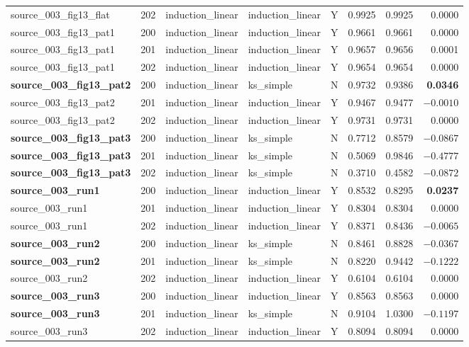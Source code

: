 \documentclass{article}
\begin{document}
\begin{table}[htbp]
\begin{tabular}{@{}p{3.0cm}rrp{2.8cm}p{2.8cm}rrr@{}}
source\_003\_fig13\_flat & 202 & induction\_linear & induction\_linear & Y & 0.9925 & 0.9925 & 0.0000 \\
source\_003\_fig13\_pat1 & 200 & induction\_linear & induction\_linear & Y & 0.9661 & 0.9661 & 0.0000 \\
source\_003\_fig13\_pat1 & 201 & induction\_linear & induction\_linear & Y & 0.9657 & 0.9656 & 0.0001 \\
source\_003\_fig13\_pat1 & 202 & induction\_linear & induction\_linear & Y & 0.9654 & 0.9654 & 0.0000 \\
\textbf{source\_003\_fig13\_pat2} & 200 & induction\_linear & ks\_simple & N & 0.9732 & 0.9386 & \textbf{0.0346} \\
source\_003\_fig13\_pat2 & 201 & induction\_linear & induction\_linear & Y & 0.9467 & 0.9477 & $-0.0010$ \\
source\_003\_fig13\_pat2 & 202 & induction\_linear & induction\_linear & Y & 0.9731 & 0.9731 & 0.0000 \\
\textbf{source\_003\_fig13\_pat3} & 200 & induction\_linear & ks\_simple & N & 0.7712 & 0.8579 & \textbf{$-0.0867$} \\
\textbf{source\_003\_fig13\_pat3} & 201 & induction\_linear & ks\_simple & N & 0.5069 & 0.9846 & \textbf{$-0.4777$} \\
\textbf{source\_003\_fig13\_pat3} & 202 & induction\_linear & ks\_simple & N & 0.3710 & 0.4582 & \textbf{$-0.0872$} \\
\textbf{source\_003\_run1} & 200 & induction\_linear & induction\_linear & Y & 0.8532 & 0.8295 & \textbf{0.0237} \\
source\_003\_run1 & 201 & induction\_linear & induction\_linear & Y & 0.8304 & 0.8304 & 0.0000 \\
source\_003\_run1 & 202 & induction\_linear & induction\_linear & Y & 0.8371 & 0.8436 & $-0.0065$ \\
\textbf{source\_003\_run2} & 200 & induction\_linear & ks\_simple & N & 0.8461 & 0.8828 & \textbf{$-0.0367$} \\
\textbf{source\_003\_run2} & 201 & induction\_linear & ks\_simple & N & 0.8220 & 0.9442 & \textbf{$-0.1222$} \\
source\_003\_run2 & 202 & induction\_linear & induction\_linear & Y & 0.6104 & 0.6104 & 0.0000 \\
\textbf{source\_003\_run3} & 200 & induction\_linear & induction\_linear & Y & 0.8563 & 0.8563 & 0.0000 \\
\textbf{source\_003\_run3} & 201 & induction\_linear & ks\_simple & N & 0.9104 & 1.0300 & \textbf{$-0.1197$} \\
source\_003\_run3 & 202 & induction\_linear & induction\_linear & Y & 0.8094 & 0.8094 & 0.0000 \\
\bottomrule
\end{tabular}
\end{table}
\end{document}
